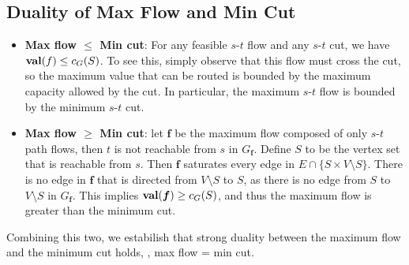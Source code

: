 \subsection{Duality of Max Flow and Min Cut}

\begin{itemize}
    \item \textbf{Max flow $\le$ Min cut}: For any feasible $s$-$t$ flow and any $s$-$t$ cut, we have $\operatorname{\textbf{val}}(f) \le c_G(S)$. To see this, simply observe that this flow must cross the cut, so the maximum value that can be routed is bounded by the maximum capacity allowed by the cut. In particular, the maximum $s$-$t$ flow is bounded by the minimum $s$-$t$ cut.
    \item \textbf{Max flow $\ge$ Min cut}: let $\boldsymbol{f}$ be the maximum flow composed of only $s$-$t$ path flows, then $t$ is not reachable from $s$ in $G_{\boldsymbol{f}}$. Define $S$ to be the vertex set that is reachable from $s$. Then $\boldsymbol{f}$ saturates every edge in $E \cap \{S \times V\setminus S\}$. There is no edge in $\boldsymbol{f}$ that is directed from $V \setminus S$ to $S$, as there is no edge from $S$ to $V \setminus S$ in $G_{\boldsymbol{f}}$. This implies $\operatorname{\textbf{val}}(\boldsymbol{f}) \ge c_G(S)$, and thus the maximum flow is greater than the minimum cut.
\end{itemize}

Combining this two, we estabilish that strong duality between the maximum flow and the minimum cut holds, \ie, max flow = min cut.